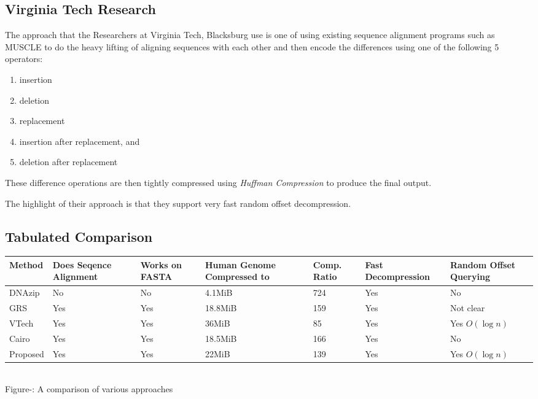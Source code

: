 \documentclass[11pt]{article}
\newcounter{fignum}
\begin{document}
\subsection{Virginia Tech Research}

The approach that the Researchers at Virginia Tech,
Blacksburg\cite{vtechresearch} use is one of using existing sequence
alignment programs such as MUSCLE\cite{muscle} to do the heavy lifting
of aligning sequences with each other and then encode the differences
using one of the following 5 operators:
\begin{enumerate}
\item insertion
\item deletion
\item replacement
\item insertion after replacement, and
\item deletion after replacement
\end{enumerate}

These difference operations are then tightly compressed using
\textit{Huffman Compression} to produce the final output.

The highlight of their approach is that they support very fast random
offset decompression.

\subsection{Tabulated Comparison}

\begin{center}
  \begin{tabular}{|p{0.6in}|p{0.7in}|p{0.5in}|p{0.8in}|p{0.5in}|p{0.9in}|p{0.9in}|}
    \hline
    Method & Does Seqence Alignment & Works on FASTA & Human Genome
    Compressed to & Comp. Ratio & Fast Decompression & Random
    Offset Querying\\
    \hline
    DNAzip & No & No & 4.1MiB & 724 & Yes & No\\
    \hline
    GRS & Yes & Yes & 18.8MiB & 159 & Yes & Not clear\\
    \hline
    VTech & Yes & Yes & 36MiB & 85 & Yes & Yes $O(\log{n})$\\
    \hline
    Cairo & Yes & Yes & 18.5MiB & 166 & Yes & No\\
    \hline
    Proposed & Yes & Yes & 22MiB & 139 & Yes & Yes $O(\log{n})$\\
    \hline
  \end{tabular}\\
  \vspace{0.3cm}
  \footnotesize{Figure-: A comparison of various
    approaches}
  \addtocounter{fignum}{1}
\end{center}
\end{document}
